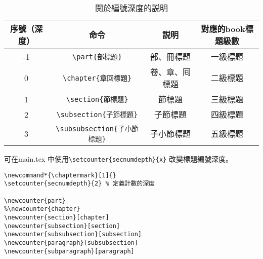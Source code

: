 \begin{table}[H]
\begin{center}
\caption{関於編號深度的説明}
\begin{tabular}{cccc}
\hline
序號（深度） & 命令& 説明 & 對應的book標題級數 \\ \hline
-1 & \verb+\part{部標題}+ & 部、冊標題 & 一級標題 \\
0 & \verb+\chapter{章回標題}+ & 卷、章、囘標題 & 二級標題  \\
1 & \verb+\section{節標題}+ & 節標題 & 三級標題 \\
2 & \verb+\subsection{子節標題}+ & 子節標題 & 四級標題 \\
3 & \verb+\subsubsection{子小節標題}+ & 子小節標題 & 五級標題 \\ \hline
\end{tabular}
\end{center}
\end{table}

\par 可在main.tex 中使用\verb+\setcounter{secnumdepth}{x}+
改變標題編號深度。
%
\begin{lstlisting}[firstnumber=859]
%文檔結構設定
\newcommand*{\chaptermark}[1]{}
\setcounter{secnumdepth}{2}	% 定義計數的深度

\newcounter{part}
%\newcounter{chapter}
\newcounter{section}[chapter]
\newcounter{subsection}[section]
\newcounter{subsubsection}[subsection]
\newcounter{paragraph}[subsubsection]
\newcounter{subparagraph}[paragraph]
\end{lstlisting}



